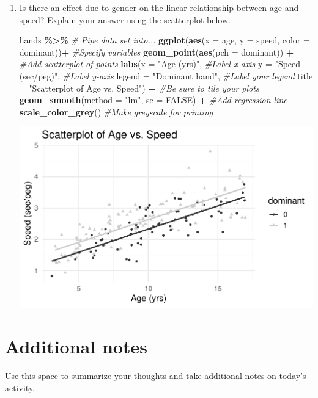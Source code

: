 \documentclass[
]{report}
\newenvironment{Shaded}{\begin{snugshade}}{\end{snugshade}}
\newcommand{\CommentTok}[1]{\textcolor[rgb]{0.56,0.35,0.01}{\textit{#1}}}
\newcommand{\DataTypeTok}[1]{\textcolor[rgb]{0.13,0.29,0.53}{#1}}
\newcommand{\KeywordTok}[1]{\textcolor[rgb]{0.13,0.29,0.53}{\textbf{#1}}}
\newcommand{\NormalTok}[1]{#1}
\newcommand{\OperatorTok}[1]{\textcolor[rgb]{0.81,0.36,0.00}{\textbf{#1}}}
\newcommand{\OtherTok}[1]{\textcolor[rgb]{0.56,0.35,0.01}{#1}}
\newcommand{\StringTok}[1]{\textcolor[rgb]{0.31,0.60,0.02}{#1}}
\begin{document}
\begin{enumerate}
\def\labelenumi{\arabic{enumi}.}
\setcounter{enumi}{19}
\item
  Is there an effect due to gender on the linear relationship between age and speed? Explain your answer using the scatterplot below.

\begin{Shaded}
\begin{Highlighting}[]
\NormalTok{hands }\OperatorTok{\%\textgreater{}\%}\StringTok{ }\CommentTok{\# Pipe data set into...}
\KeywordTok{ggplot}\NormalTok{(}\KeywordTok{aes}\NormalTok{(}\DataTypeTok{x =}\NormalTok{ age, }\DataTypeTok{y =}\NormalTok{ speed, }\DataTypeTok{color =}\NormalTok{ dominant))}\OperatorTok{+}\StringTok{  }\CommentTok{\#Specify variables}
\StringTok{  }\KeywordTok{geom\_point}\NormalTok{(}\KeywordTok{aes}\NormalTok{(}\DataTypeTok{pch =}\NormalTok{ dominant)) }\OperatorTok{+}\StringTok{  }\CommentTok{\#Add scatterplot of points}
\StringTok{  }\KeywordTok{labs}\NormalTok{(}\DataTypeTok{x =} \StringTok{"Age (yrs)"}\NormalTok{,  }\CommentTok{\#Label x{-}axis}
       \DataTypeTok{y =} \StringTok{"Speed (sec/peg)"}\NormalTok{,  }\CommentTok{\#Label y{-}axis}
       \DataTypeTok{legend =} \StringTok{"Dominant hand"}\NormalTok{,  }\CommentTok{\#Label your legend}
       \DataTypeTok{title =} \StringTok{"Scatterplot of Age vs. Speed"}\NormalTok{) }\OperatorTok{+}\StringTok{ }\CommentTok{\#Be sure to tile your plots}
\StringTok{  }\KeywordTok{geom\_smooth}\NormalTok{(}\DataTypeTok{method =} \StringTok{"lm"}\NormalTok{, }\DataTypeTok{se =} \OtherTok{FALSE}\NormalTok{) }\OperatorTok{+}\StringTok{  }\CommentTok{\#Add regression line}
\StringTok{  }\KeywordTok{scale\_color\_grey}\NormalTok{() }\CommentTok{\#Make greyscale for printing }
\end{Highlighting}
\end{Shaded}

  \begin{center}\includegraphics[width=0.7\linewidth]{10-regression_files/figure-latex/unnamed-chunk-6-1} \end{center}
\end{enumerate}

\vspace{1in}

\hypertarget{additional-notes}{%
\section{Additional notes}\label{additional-notes}}

Use this space to summarize your thoughts and take additional notes on today's activity.
\end{document}
